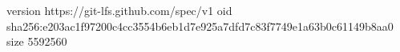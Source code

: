 version https://git-lfs.github.com/spec/v1
oid sha256:e203ac1f97200c4cc3554b6eb1d7e925a7dfd7c83f7749e1a63b0c61149b8aa0
size 5592560
